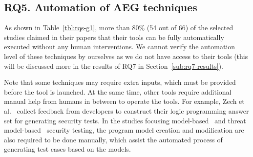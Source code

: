 \subsection{RQ5. Automation of AEG techniques}

As shown in Table~\ref{tbl:rqs-g1}, more than 80\% (54 out of 66) of the selected studies claimed in their papers that their tools can be fully automatically executed without any human interventions. 
We cannot verify the automation level of these techniques by ourselves as we do not have access to their tools (this will be discussed more in the results of RQ7 in Section~\ref{sub:rq7-results}).

Note that some techniques may require extra inputs, which must be provided before the tool is launched. At the same time, other tools require additional manual help from humans in between to operate the tools. For example, Zech et al.~\cite{Zech201488} collect feedback from developers to construct their logic programming answer set for generating security tests. In the studies focusing model-based~\cite{Pretschner2008338, Lebeau2013445, Khamaiseh2017534} and threat model-based~\cite{xu2011tool, xu2012automated, Xu2015247, marback2013threat} security testing, the program model creation and modification are also required to be done manually, which assist the automated process of generating test cases based on the models.

